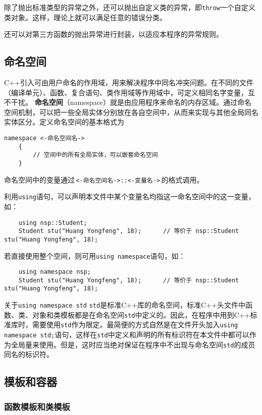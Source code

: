 \documentclass[10pt, a4paper, oneside, fontset=none]{ctexart}
\theoremstyle{plain}
\theoremstyle{definition}
\newcommand{\zhu}[2][]{\begin{note}{#1}\xiu #2\end{note}}
\newcommand{\tboba}[1]{\textbf{\kai\color{bali!75!black}#1}}
\begin{document}
除了抛出标准类型的异常之外，还可以抛出自定义类的异常，即\texttt{throw}一个自定义类对象。这样，理论上就可以满足任意的错误分类。

还可以对第三方函数的抛出异常进行封装，以适应本程序的异常规则。

\subsection{命名空间}

C++引入可由用户命名的作用域，用来解决程序中同名冲突问题。在不同的文件（编译单元）、函数、复合语句、类作用域等作用域中，可定义相同名字变量，互不干扰。
\tboba{命名空间}（namespace）就是由应用程序来命名的内存区域。通过命名空间机制，可以把一些全局实体分别放在各自空间中，从而来实现与其他全局同名实体区分。定义命名空间的基本格式为
\begin{lstlisting}[style=intro]
	namespace <-命名空间名->
	{
		// 空间中的所有全局实体，可以嵌套命名空间
	}
\end{lstlisting}
命名空间中的变量通过\,\lstinline[style=intro]|<-命名空间名->::<-变量名->|\,的格式调用。

利用\texttt{using}语句，可以声明本文件中某个变量名均指这一命名空间中的这一变量，如：
\begin{lstlisting}
	using nsp::Student;
	Student stu("Huang Yongfeng", 18);		// 等价于 nsp::Student stu("Huang Yongfeng", 18);
\end{lstlisting}
若直接使用整个空间，则可用\texttt{using namespace}语句，如：
\begin{lstlisting}
	using namespace nsp;
	Student stu("Huang Yongfeng", 18);		// 等价于 nsp::Student stu("Huang Yongfeng", 18);
\end{lstlisting}

\zhu[关于\texttt{using namespace std}]{
	\texttt{std}是标准C++库的命名空间，标准C++头文件中函数、类、对象和类模板都是在命名空间\texttt{std}中定义的。因此，在程序中用到C++标准库时，需要使用\texttt{std}作为限定。最简便的方式自然是在文件开头加入\texttt{using namespace std;}语句，这样在\texttt{std}中定义和声明的所有标识符在本文件中都可以作为全局量来使用。但是，这时应当绝对保证在程序中不出现与命名空间\texttt{std}的成员同名的标识符。
}


\subsection{模板和容器}

\subsubsection{函数模板和类模板}
\end{document}
